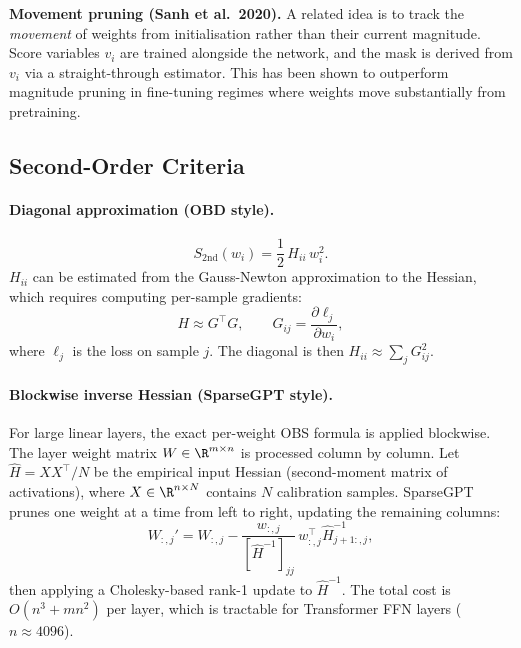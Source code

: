 \textbf{Movement pruning (Sanh et al.\ 2020).}  A related idea is to track
the \emph{movement} of weights from initialisation rather than their current
magnitude.  Score variables $v_i$ are trained alongside the network, and
the mask is derived from $v_i$ via a straight-through estimator.  This has
been shown to outperform magnitude pruning in fine-tuning regimes where
weights move substantially from pretraining.

\subsection{Second-Order Criteria}
\label{subsec:second_order_criteria}

\paragraph{Diagonal approximation (OBD style).}
\begin{equation}
	S_{\mathrm{2nd}}(w_i) = \frac{1}{2}\,H_{ii}\,w_i^2.
	\label{eq:second_order}
\end{equation}
$H_{ii}$ can be estimated from the Gauss-Newton approximation to the Hessian,
which requires computing per-sample gradients:
\begin{equation}
	H \approx G^\top G, \qquad G_{ij} = \frac{\partial \ell_j}{\partial w_i},
\end{equation}
where $\ell_j$ is the loss on sample $j$.  The diagonal is then
$H_{ii} \approx \sum_j G_{ij}^2$.

\paragraph{Blockwise inverse Hessian (SparseGPT style).}
For large linear layers, the exact per-weight OBS formula is applied
blockwise.  The layer weight matrix $W \in \R^{m \times n}$ is processed
column by column.  Let $\hat{H} = X X^\top / N$ be the empirical input
Hessian (second-moment matrix of activations), where
$X \in \R^{n \times N}$ contains $N$ calibration samples.  SparseGPT
\cite{frantar2023sparsegpt} prunes
one weight at a time from left to right, updating the remaining columns:
\begin{equation}
	W_{:,j}' = W_{:,j} - \frac{w_{:,j}}{[\hat{H}^{-1}]_{jj}}\, w_{:,j}^\top \hat{H}^{-1}_{j+1:, j},
	\label{eq:sparsegpt}
\end{equation}
then applying a Cholesky-based rank-1 update to $\hat{H}^{-1}$.  The total
cost is $O(n^3 + mn^2)$ per layer, which is tractable for Transformer FFN
layers ($n \approx 4096$).

